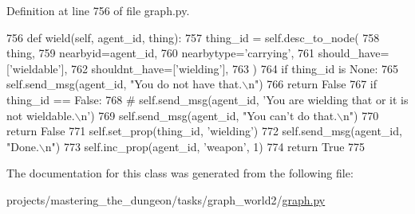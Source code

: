 Definition at line 756 of file graph.\+py.


\begin{DoxyCode}
756     \textcolor{keyword}{def }wield(self, agent\_id, thing):
757         thing\_id = self.desc\_to\_node(
758             thing,
759             nearbyid=agent\_id,
760             nearbytype=\textcolor{stringliteral}{'carrying'},
761             should\_have=[\textcolor{stringliteral}{'wieldable'}],
762             shouldnt\_have=[\textcolor{stringliteral}{'wielding'}],
763         )
764         \textcolor{keywordflow}{if} thing\_id \textcolor{keywordflow}{is} \textcolor{keywordtype}{None}:
765             self.send\_msg(agent\_id, \textcolor{stringliteral}{"You do not have that.\(\backslash\)n"})
766             \textcolor{keywordflow}{return} \textcolor{keyword}{False}
767         \textcolor{keywordflow}{if} thing\_id == \textcolor{keyword}{False}:
768             \textcolor{comment}{# self.send\_msg(agent\_id, 'You are wielding that or it is not wieldable.\(\backslash\)n')}
769             self.send\_msg(agent\_id, \textcolor{stringliteral}{"You can't do that.\(\backslash\)n"})
770             \textcolor{keywordflow}{return} \textcolor{keyword}{False}
771         self.set\_prop(thing\_id, \textcolor{stringliteral}{'wielding'})
772         self.send\_msg(agent\_id, \textcolor{stringliteral}{"Done.\(\backslash\)n"})
773         self.inc\_prop(agent\_id, \textcolor{stringliteral}{'weapon'}, 1)
774         \textcolor{keywordflow}{return} \textcolor{keyword}{True}
775 
\end{DoxyCode}


The documentation for this class was generated from the following file\+:\begin{DoxyCompactItemize}
\item 
projects/mastering\+\_\+the\+\_\+dungeon/tasks/graph\+\_\+world2/\hyperlink{projects_2mastering__the__dungeon_2tasks_2graph__world2_2graph_8py}{graph.\+py}\end{DoxyCompactItemize}
